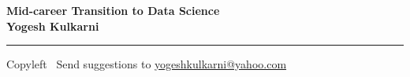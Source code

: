 
\graphicspath{{images/}}

\footnotesize


\begin{center}
\Large{\textbf{Mid-career Transition to Data Science\\ Yogesh Kulkarni}}  
\end{center}

\begin{multicols}{2}


\end{multicols}

\rule{\linewidth}{0.25pt}
\scriptsize
Copyleft \textcopyleft\  Send suggestions to 
\href{http://www.yogeshkulkarni.com}{yogeshkulkarni@yahoo.com}


